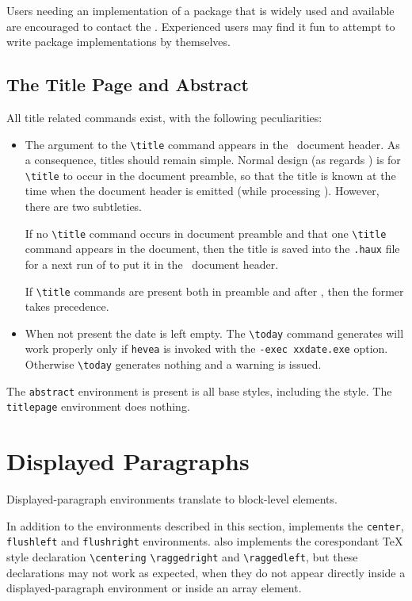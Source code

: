 Users needing an implementation of a package that is widely used and
available are encouraged to contact the
.
Experienced users may find it fun to attempt to write package
implementations by themselves.


\subsection{The Title Page and Abstract}
All title related commands exist, with the following peculiarities:
\begin{itemize}
  \item
  The argument to the \verb+\title+ command appears
  in the \html{}~document header. As a consequence, titles should
  remain simple. Normal design (as regards \hevea{}) is for
  \verb+\title+ to occur in the document preamble, so that the title
  is known at the time when the document header is emitted (while
  processing \verb++). However, there are two subtleties.

  If no \verb+\title+
  command occurs in document preamble and that one \verb+\title+
  command appears in the document, then the title is saved into the
  \texttt{.haux} file for a next run of \hevea{} to put it in the
  \html{}~document header.

  If \verb+\title+ commands are present both in preamble and after
 \verb++, then the former takes precedence.

 \item When not present the date is left empty. The
 \verb+\today+ command generates will work properly
 only if \texttt{hevea} is invoked with the \verb+-exec xxdate.exe+
 option.  Otherwise \verb+\today+ generates nothing and a warning is
 issued.
\end{itemize}

The \verb+abstract+ environment is present is all base styles,
including the  style.
The \verb+titlepage+ environment does nothing.

\section{Displayed Paragraphs}
Displayed-paragraph environments translate to block-level
elements.

In addition to the environments described in this section,
\hevea{} implements the \verb+center+, \verb+flushleft+ and
\verb+flushright+ environments.
\hevea{} also implements the corespondant \TeX{} style declaration
\verb+\centering+ \verb+\raggedright+ and \verb+\raggedleft+,
but these declarations may not work as expected, when they do not
appear directly inside a displayed-paragraph environment or inside an array
element.




